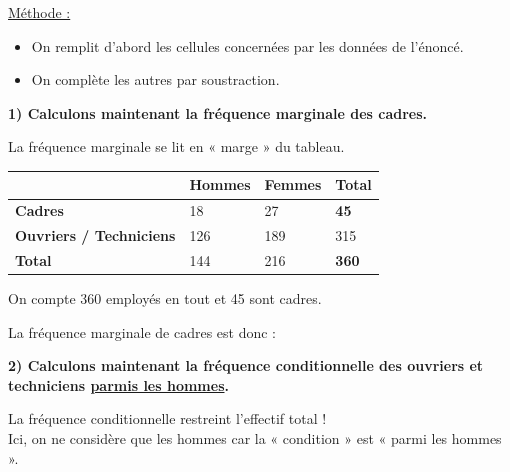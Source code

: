 \documentclass[12pt]{article}
\begin{document}
\vspace{5pt}

\underline{Méthode :}
\begin{itemize}
    \item On remplit d'abord les cellules concernées par les données de l'énoncé.
    \item On complète les autres par soustraction.
\end{itemize}

\vspace{15pt}

\textbf{\hspace{1cm}1) Calculons maintenant la fréquence marginale des cadres.}

\vspace{5pt}
{\color{red}La fréquence marginale se lit en « marge » du tableau.}

\begin{center}
    \begin{tabular}{|p{5cm}|p{3cm}|p{3cm}|p{3cm}|}
        \hline
        & \textbf{Hommes} & \rule{0pt}{0.5cm} \textbf{Femmes} & \cellcolor{ForestGreen!40}\textbf{Total} \\
        \hline
        \textbf{Cadres} & \rule{0pt}{0.5cm}18 & 27 &  \cellcolor{ForestGreen!40}\textbf{45}\\
        \hline
        \textbf{Ouvriers / Techniciens} & \rule{0pt}{0.5cm}126 & 189 &  \cellcolor{ForestGreen!40}315\\
        \hline
        \textbf{Total} & \rule{0pt}{0.5cm}144 & 216 &  \cellcolor{ForestGreen!40}\textbf{360}\\
        \hline
    \end{tabular}
\end{center}

On compte 360 employés en tout et 45 sont cadres.
\vspace{5pt}

La fréquence marginale de cadres est donc :
\vspace{2cm}

\vspace{15pt}
\newpage
\textbf{\hspace{1cm}2) Calculons maintenant la fréquence conditionnelle des ouvriers et techniciens
\underline{parmis les hommes}.}

\vspace{5pt}
{\color{red}La fréquence conditionnelle restreint l'effectif total ! \\Ici, on ne considère que les 
hommes car la « condition » est « parmi les hommes ».}
\end{document}
